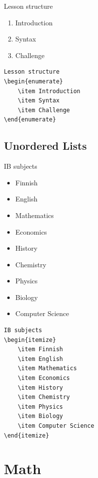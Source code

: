 \documentclass{article}
\begin{document}
Lesson structure
\begin{enumerate}
	\item Introduction
	\item Syntax
	\item Challenge
\end{enumerate}

\begin{verbatim}
Lesson structure
\begin{enumerate}
	\item Introduction
	\item Syntax
	\item Challenge
\end{enumerate}
\end{verbatim}

\subsection{Unordered Lists}

IB subjects
\begin{itemize}
	\item Finnish
	\item English
	\item Mathematics
	\item Economics
	\item History
	\item Chemistry
	\item Physics
	\item Biology
	\item Computer Science
\end{itemize}

\newpage

\begin{verbatim}
IB subjects
\begin{itemize}
	\item Finnish
	\item English
	\item Mathematics
	\item Economics
	\item History
	\item Chemistry
	\item Physics
	\item Biology
	\item Computer Science
\end{itemize}
\end{verbatim}

\section{Math}
\end{document}
